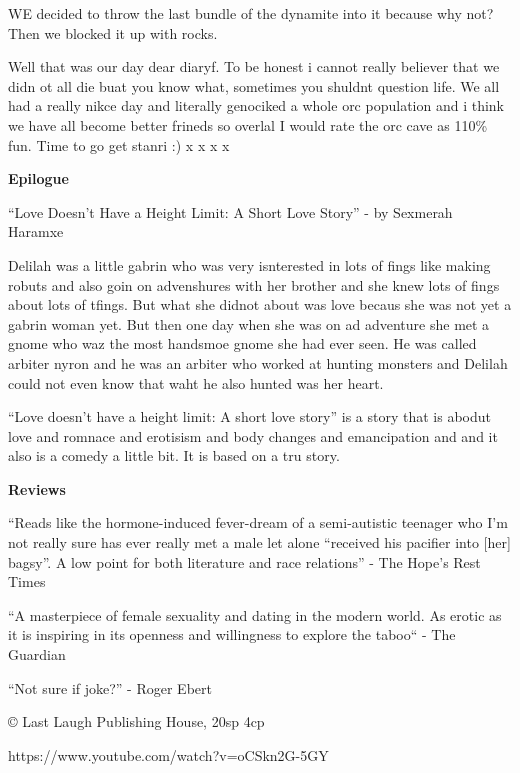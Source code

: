 \begin{multicols}{2}
WE decided to throw the last bundle of the dynamite into it because why not? Then we blocked it up with rocks.\medskip

Well that was our day dear diaryf. To be honest i cannot really believer that we didn ot all die buat you know what, sometimes you shuldnt question life. We all had a really nikce day and literally genociked a whole orc population and i think we have all become better frineds so overlal I would rate the orc cave as 110\% fun. Time to go get stanri :) x x x x\medskip

\textbf{Epilogue}\medskip

“Love Doesn’t Have a Height Limit: A Short Love Story” - by Sexmerah Haramxe\medskip

Delilah was a little gabrin who was very isnterested in lots of fings like making robuts and also goin on advenshures with her brother and she knew lots of fings about lots of tfings. But what she didnot about was love becaus she was not yet a gabrin woman yet. But then one day when she was on ad adventure she met a gnome who waz the most handsmoe gnome she had ever seen. He was called arbiter nyron and he was an arbiter who worked at hunting monsters and Delilah could not even know that waht he also hunted was her heart.\medskip

“Love doesn’t have a height limit: A short love story” is a story that is abodut love and romnace and erotisism and body changes and emancipation and and it also is a comedy a little bit. It is based on a tru story.\medskip

\textbf{Reviews}\medskip

“Reads like the hormone-induced fever-dream of a semi-autistic teenager who I’m not really sure has ever really met a male let alone “received his pacifier into [her] bagsy”. A low point for both literature and race relations” - The Hope’s Rest Times\medskip

“A masterpiece of female sexuality and dating in the modern world. As erotic as it is inspiring in its openness and willingness to explore the taboo“ - The Guardian\medskip

“Not sure if joke?” - Roger Ebert\medskip

© Last Laugh Publishing House, 20sp 4cp\medskip

https://www.youtube.com/watch?v=oCSkn2G-5GY



\end{multicols}

\vspace*{5mm}

